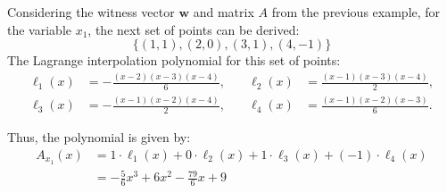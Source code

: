 \documentclass{zkdl-presentation-template}
\begin{document}
    \begin{frame}
        \begin{example}
            Considering the witness vector $\mathbf{w}$ and matrix $A$ from the previous example, for the variable
            $x_1$, the next set of points can be derived:
            \vspace{-10pt}
            \begin{equation*}
                \{(1,1), (2,0), (3,1), (4,-1)\}
            \end{equation*}
            The Lagrange interpolation polynomial for this set of points:
            \begin{align*}
                \ell_1(x) &= -\frac{(x - 2)(x - 3)(x - 4)}{6}, \quad &\ell_2(x) &= \frac{(x - 1)(x - 3)(x - 4)}{2}, \\
                \ell_3(x) &= -\frac{(x - 1)(x - 2)(x - 4)}{2}, \quad &\ell_4(x) &= \frac{(x - 1)(x - 2)(x - 3)}{6}.
            \end{align*}

            Thus, the polynomial is given by:
            \begin{align*}
                A_{x_1}(x) &= 1 \cdot \ell_1(x) + 0 \cdot \ell_2(x) + 1 \cdot \ell_3(x) + (-1) \cdot \ell_4(x) \\
                &= -\frac{5}{6}x^3 + 6x^2 - \frac{79}{6}x + 9
            \end{align*}
        \end{example}
    \end{frame}
\end{document}
